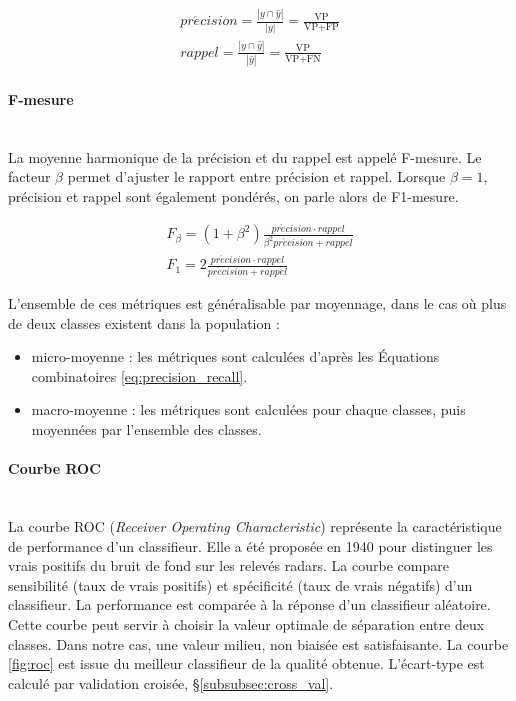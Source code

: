 \begin{equation} \label{eq:precision_recall}
\begin{split}
pr\acute{e}cision = \frac{|y \cap \hat{y}|}{|y|} = \frac{\text{VP}}{\text{VP}+\text{FP}}
\\
rappel = \frac{|y \cap \hat{y}|}{|\hat{y}|} = \frac{\text{VP}}{\text{VP}+\text{FN}}
\end{split}
\end{equation}

\paragraph{F-mesure}\mbox{} \\
La moyenne harmonique de la précision et du rappel est appelé F-mesure.
Le facteur $\beta$ permet d'ajuster le rapport entre précision et rappel.
Lorsque $\beta = 1$, précision et rappel sont également pondérés, on parle alors de F1-mesure.

\begin{equation} \label{eq:f1_score}
\begin{split}
F_{\beta}=\left(1+\beta^{2}\right) \frac{pr\acute{e}cision \cdot rappel}{\beta^{2} pr\acute{e}cision + rappel}
\\
F_{1}= 2 \frac{pr\acute{e}cision \cdot rappel}{pr\acute{e}cision + rappel}
\end{split}
\end{equation}

L'ensemble de ces métriques est généralisable par moyennage, dans le cas où plus de deux classes existent dans la population :
\begin{itemize}
\item micro-moyenne : les métriques sont calculées d'après les Équations combinatoires \ref{eq:precision_recall}.
\item macro-moyenne : les métriques sont calculées pour chaque classes, puis moyennées par l'ensemble des classes.
\end{itemize}

\paragraph{Courbe ROC}\mbox{} \\
La courbe ROC (\textit{Receiver Operating Characteristic}) représente la caractéristique de performance d'un classifieur.
Elle a été proposée en 1940 pour distinguer les vrais positifs du bruit de fond sur les relevés radars.
La courbe compare sensibilité (taux de vrais positifs) et spécificité (taux de vrais négatifs) d'un classifieur.
La performance est comparée à la réponse d'un classifieur aléatoire.
Cette courbe peut servir à choisir la valeur optimale de séparation entre deux classes.
Dans notre cas, une valeur milieu, non biaisée est satisfaisante.
La courbe \ref{fig:roc} est issue du meilleur classifieur de la qualité obtenue.
L'écart-type est calculé par validation croisée, §\ref{subsubsec:cross_val}.

